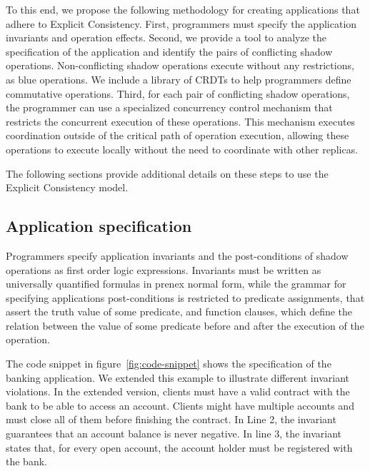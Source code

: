 \documentclass[11pt,dvipdfm]{article}
\begin{document}
To this end, we propose the following methodology for creating applications
that adhere to Explicit Consistency.
First, programmers must specify the application invariants and operation effects.
Second, we provide a tool to analyze the specification of the application
and identify the pairs of conflicting shadow operations.
Non-conflicting shadow operations execute without any restrictions, as blue
operations. We include a library of CRDTs to help programmers define
commutative operations.
Third, for each pair of conflicting shadow operations,
the programmer can use a specialized concurrency control mechanism
that restricts the concurrent execution of these operations.
This mechanism executes coordination outside of the critical path of
operation execution, allowing these operations to execute locally
without the need to coordinate with other replicas.

The following sections provide additional details on these steps to
use the Explicit Consistency model.

\subsection{Application specification}
Programmers specify application invariants and the post-conditions
of shadow operations as
first order logic expressions.
Invariants must be written as universally quantified formulas in prenex normal
form, while the grammar for specifying applications post-conditions is
restricted to predicate assignments, that assert the truth value of some
predicate, and function clauses, which define the relation between the value of
some predicate before and after the execution of the operation.

The code snippet in figure~\ref{fig:code-snippet} shows the specification of the
banking application.
We extended this example to illustrate different invariant violations.
In the extended version, clients must have a valid contract with the bank to
be able to access an account.
Clients might have multiple accounts and must close all of them before finishing the contract.
In Line 2, the invariant guarantees that an account balance is never negative.
In line 3, the invariant states that, for every open account, the account holder must be registered with the bank.
\end{document}
